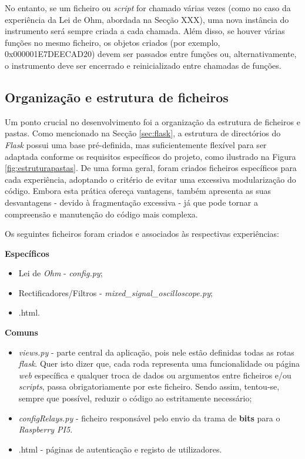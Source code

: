 No entanto, se um ficheiro ou \textit{script} for chamado várias vezes (como no caso da experiência da Lei de Ohm, abordada na Secção XXX), uma nova instância do instrumento será sempre criada a cada chamada. Além disso, se houver várias funções no mesmo ficheiro, os objetos criados (por exemplo, 0x000001E7DEECAD20) devem ser passados entre funções ou, alternativamente, o instrumento deve ser encerrado e reinicializado entre chamadas de funções.

\subsection{Organização e estrutura de ficheiros}
\label{sec:organizacao_ficheiros}

Um ponto crucial no desenvolvimento foi a organização da estrutura de ficheiros e pastas. Como mencionado na Secção \ref{sec:flask}, a estrutura de directórios do \textit{Flask} possui uma base pré-definida, mas suficientemente flexível para ser adaptada conforme os requisitos específicos do projeto, como ilustrado na Figura \ref{fig:estruturapastas}. De uma forma geral, foram criados ficheiros específicos para cada experiência, adoptando o critério de evitar uma excessiva modularização do código. Embora esta prática ofereça vantagens, também apresenta as suas desvantagens - devido à fragmentação excessiva - já que pode tornar a compreensão e manutenção do código mais complexa.

Os seguintes ficheiros foram criados e associados às respectivas experiências:

\textbf{Específicos}
\begin{itemize}
	\item Lei de \textit{Ohm} - \textit{config.py};
	\item Rectificadores/Filtros - \textit{mixed\_signal\_oscilloscope.py};
	\item {}.html.
\end{itemize}

\textbf{Comuns}
\begin{itemize}
	\item \textit{views.py} - parte central da aplicação, pois nele estão definidas todas as rotas \textit{flask}. Quer isto dizer que, cada roda representa uma funcionalidade ou página \textit{web} específica e qualquer troca de dados ou argumentos entre ficheiros e/ou \textit{scripts}, passa obrigatoriamente por este ficheiro. Sendo assim, tentou-se, sempre que possível, reduzir o código ao estritamente necessário;
	\item \textit{configRelays.py} - ficheiro responsável pelo envio da trama de \textbf{bits} para o \textit{Raspberry PI5}.
	\item {}.html - páginas de autenticação e registo de utilizadores.
\end{itemize}

